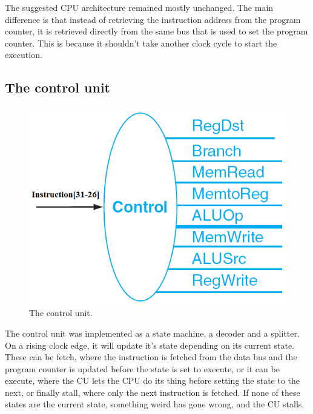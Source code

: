 The suggested CPU architecture remained mostly unchanged.
The main difference is that instead of retrieving the instruction address from the program counter, %
it is retrieved directly from the same bus that is used to set the program
counter. This is because it shouldn't take another clock cycle to start the
execution.

\subsection{The control unit}
\begin{figure}[ht]
    \centering
    \includegraphics[scale=0.3]{figures/controlunit.png}
    \caption{\label{fig:controlUnit}The control unit.}
\end{figure}
The control unit was implemented as a state machine, a decoder and a splitter.
On a rising clock edge, it will update it's state depending on its current
state. These can be fetch, where the instruction is fetched from the data bus
and the program counter is updated before the state is set to execute, or it can
be execute, where the CU lets the CPU do its thing before setting the state to
the next, or finally stall, where only the next instruction is fetched. If none
of these states are the current state, something weird has gone wrong, and the
CU stalls.
